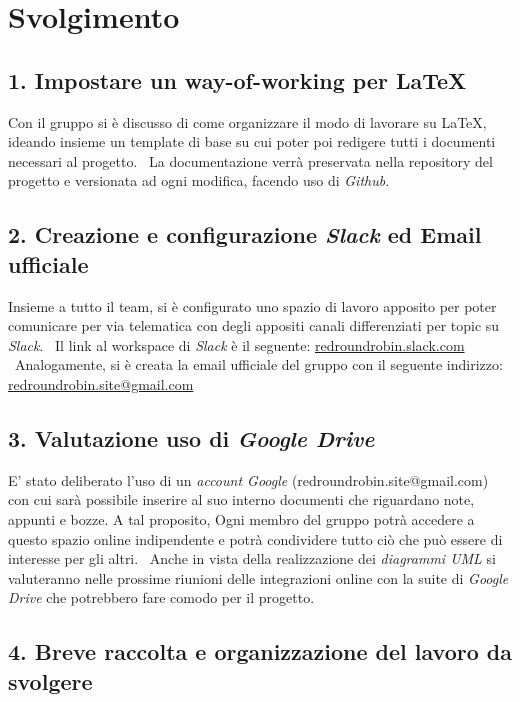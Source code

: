 \newpage
\section*{Svolgimento}

\subsection*{1. Impostare un way-of-working per \LaTeX{} }

Con il gruppo si è discusso di come organizzare il modo di lavorare su \LaTeX{}, ideando insieme un template di base su cui poter poi redigere tutti i documenti necessari al progetto. \
La documentazione verrà preservata nella repository del progetto e versionata ad ogni modifica, facendo uso di \textit{Github}.

\subsection*{2. Creazione e configurazione \textit{Slack} ed Email ufficiale}

Insieme a tutto il team, si è configurato uno spazio di lavoro apposito per poter comunicare per via telematica con degli appositi canali differenziati per topic su \textit{Slack}. \
Il link al workspace di \textit{Slack} è il seguente: \href{http://redroundrobin.slack.com}{redroundrobin.slack.com} \
Analogamente, si è creata la email ufficiale del gruppo con il seguente indirizzo:
\href{mailto:redroundrobin.site@gmail.com}{redroundrobin.site@gmail.com}


\subsection*{3. Valutazione uso di \textit{Google Drive}}

E' stato deliberato l'uso di un \textit{account Google} (redroundrobin.site@gmail.com) con cui sarà possibile inserire al suo interno documenti che riguardano note, appunti e bozze. A tal proposito, Ogni membro del gruppo potrà accedere a questo spazio online indipendente e potrà condividere tutto ciò che può essere di interesse per gli altri. \
Anche in vista della realizzazione dei \textit{diagrammi UML} si valuteranno nelle prossime riunioni delle integrazioni online con la suite di \textit{Google Drive} che potrebbero fare comodo per il progetto.


\subsection*{4. Breve raccolta e organizzazione del lavoro da svolgere}

